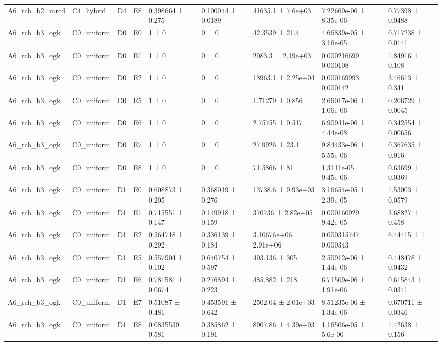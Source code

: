 \begin{table}
\begin{tabular}{lllllllll}
A6\_rch\_b2\_mrcd & C4\_hybrid & D4 & E8 & 0.398664 ± 0.275 & 0.100044 ± 0.0189 & 41635.1 ± 7.6e+03 & 7.22669e-06 ± 8.35e-06 & 0.77398 ± 0.0488 \\
A6\_rch\_b3\_ogk & C0\_uniform & D0 & E0 & 1 ± 0 & 0 ± 0 & 42.3539 ± 21.4 & 4.66839e-05 ± 3.16e-05 & 0.717238 ± 0.0141 \\
A6\_rch\_b3\_ogk & C0\_uniform & D0 & E1 & 1 ± 0 & 0 ± 0 & 2083.3 ± 2.19e+03 & 0.000216699 ± 0.000108 & 1.84916 ± 0.108 \\
A6\_rch\_b3\_ogk & C0\_uniform & D0 & E2 & 1 ± 0 & 0 ± 0 & 18963.1 ± 2.25e+04 & 0.000169993 ± 0.000142 & 3.46613 ± 0.341 \\
A6\_rch\_b3\_ogk & C0\_uniform & D0 & E5 & 1 ± 0 & 0 ± 0 & 1.71279 ± 0.856 & 2.66017e-06 ± 1.06e-06 & 0.206729 ± 0.0045 \\
A6\_rch\_b3\_ogk & C0\_uniform & D0 & E6 & 1 ± 0 & 0 ± 0 & 2.75755 ± 0.517 & 6.90941e-06 ± 4.44e-08 & 0.342554 ± 0.00656 \\
A6\_rch\_b3\_ogk & C0\_uniform & D0 & E7 & 1 ± 0 & 0 ± 0 & 27.9926 ± 23.1 & 9.84433e-06 ± 5.55e-06 & 0.367635 ± 0.016 \\
A6\_rch\_b3\_ogk & C0\_uniform & D0 & E8 & 1 ± 0 & 0 ± 0 & 71.5866 ± 81 & 1.3111e-05 ± 9.45e-06 & 0.63699 ± 0.0369 \\
A6\_rch\_b3\_ogk & C0\_uniform & D1 & E0 & 0.608873 ± 0.205 & 0.368019 ± 0.276 & 13738.6 ± 9.93e+03 & 3.16654e-05 ± 2.39e-05 & 1.53003 ± 0.0579 \\
A6\_rch\_b3\_ogk & C0\_uniform & D1 & E1 & 0.715551 ± 0.147 & 0.149918 ± 0.159 & 370736 ± 2.82e+05 & 0.000160929 ± 9.42e-05 & 3.68827 ± 0.458 \\
A6\_rch\_b3\_ogk & C0\_uniform & D1 & E2 & 0.564718 ± 0.292 & 0.336139 ± 0.184 & 3.10676e+06 ± 2.91e+06 & 0.000315747 ± 0.000343 & 6.44415 ± 1 \\
A6\_rch\_b3\_ogk & C0\_uniform & D1 & E5 & 0.557904 ± 0.102 & 0.640754 ± 0.597 & 403.136 ± 305 & 2.50912e-06 ± 1.44e-06 & 0.448478 ± 0.0432 \\
A6\_rch\_b3\_ogk & C0\_uniform & D1 & E6 & 0.781581 ± 0.0674 & 0.276894 ± 0.223 & 485.882 ± 218 & 6.71509e-06 ± 1.91e-06 & 0.615843 ± 0.0341 \\
A6\_rch\_b3\_ogk & C0\_uniform & D1 & E7 & 0.51087 ± 0.481 & 0.453591 ± 0.642 & 2502.04 ± 2.01e+03 & 8.51235e-06 ± 1.34e-06 & 0.670711 ± 0.0346 \\
A6\_rch\_b3\_ogk & C0\_uniform & D1 & E8 & 0.0835539 ± 0.581 & 0.385862 ± 0.191 & 8907.86 ± 4.39e+03 & 1.16506e-05 ± 5.6e-06 & 1.42638 ± 0.156 \\

\end{tabular}
\end{table}

